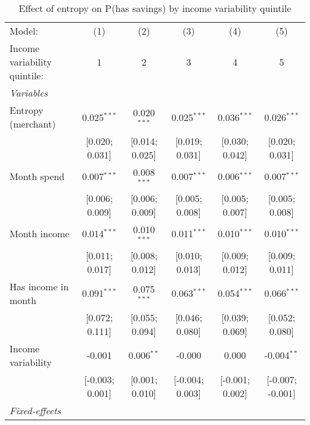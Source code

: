 
\begin{table}[htbp]
   \centering
   \tiny
   \begin{threeparttable}[b]
      \caption{\label{tab:reg_has_inflows_entropy_merchant_z_inc_var_quint} Effect of entropy on P(has savings) by income variability quintile}
      \begin{tabular}{lccccc}
         \tabularnewline \midrule \midrule
         Model:                       & (1)             & (2)            & (3)             & (4)             & (5)\\  
         Income variability quintile: & 1               & 2              & 3               & 4               & 5 \\   
         \midrule
         \emph{Variables}\\
         Entropy (merchant)           & 0.025$^{***}$   & 0.020$^{***}$  & 0.025$^{***}$   & 0.036$^{***}$   & 0.026$^{***}$\\   
                                      & [0.020; 0.031]  & [0.014; 0.025] & [0.019; 0.031]  & [0.030; 0.042]  & [0.020; 0.031]\\   
         Month spend                  & 0.007$^{***}$   & 0.008$^{***}$  & 0.007$^{***}$   & 0.006$^{***}$   & 0.007$^{***}$\\   
                                      & [0.006; 0.009]  & [0.006; 0.009] & [0.005; 0.008]  & [0.005; 0.007]  & [0.005; 0.008]\\   
         Month income                 & 0.014$^{***}$   & 0.010$^{***}$  & 0.011$^{***}$   & 0.010$^{***}$   & 0.010$^{***}$\\   
                                      & [0.011; 0.017]  & [0.008; 0.012] & [0.010; 0.013]  & [0.009; 0.012]  & [0.009; 0.011]\\   
         Has income in month          & 0.091$^{***}$   & 0.075$^{***}$  & 0.063$^{***}$   & 0.054$^{***}$   & 0.066$^{***}$\\   
                                      & [0.072; 0.111]  & [0.055; 0.094] & [0.046; 0.080]  & [0.039; 0.069]  & [0.052; 0.080]\\   
         Income variability           & -0.001          & 0.006$^{**}$   & -0.000          & 0.000           & -0.004$^{**}$\\   
                                      & [-0.003; 0.001] & [0.001; 0.010] & [-0.004; 0.003] & [-0.001; 0.002] & [-0.007; -0.001]\\   
         \midrule
         \emph{Fixed-effects}\\

\end{tabular}
\end{threeparttable}
\end{table}
